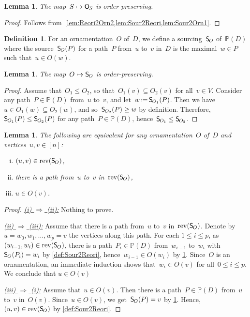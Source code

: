 \documentclass{amsart}
\newtheorem{lemma}[theorem]{Lemma}
\theoremstyle{definition}
\newtheorem{definition}[theorem]{Definition}
\newcommand{\eqdef}{\mbox{\,\raisebox{0.2ex}{\scriptsize\ensuremath{\mathrm:}}\ensuremath{=}\,}} %
\newcommand{\Vincent}[1]{\todo[size=\tiny,color=blue!30]{ #1 \\ \hfill --- V.}\,}
\newcommand{\mymap}[2]{\mathsf{#1}_{\hspace{-.7pt}#2}}
\newcommand{\orn}[1]{\mymap{O}{#1}}  %
\DeclareMathOperator{\rev}{rev} %
\newcommand{\sour}[1]{\mymap{S}{#1}}  %
\newcommand{\PP}{\mathbb P} %
\begin{document}
\begin{lemma}
\label{lem:Sour2Orn3}
The map~$S \mapsto \orn{S}$ is order-preserving.
\end{lemma}

\begin{proof}
Follows from~\cref{lem:Reori2Orn2,lem:Sour2Reori,lem:Sour2Orn1}.
\end{proof}

\begin{definition}
\label{def:Orn2Sour}
For an ornamentation~$O$ of~$D$, we define a sourcing~$\sour{O}$ of~$\PP(D)$ where the source~$\sour{O}(P)$ for a path~$P$ from~$u$ to~$v$ in~$D$ is the maximal~$w \in P$ such that~$u \in O(w)$.
\end{definition}

\begin{lemma}
\label{lem:Orn2Sour1}
The map~$O \mapsto \sour{O}$ is order-preserving.
\end{lemma}

\begin{proof}
Assume that~$O_1 \le O_2$, so that~$O_1(v) \subseteq O_2(v)$ for all~$v \in V$.
Consider any path~$P \in \PP(D)$ from~$u$ to~$v$, and let~$w \eqdef \sour{O_1}(P)$.
Then we have~$u \in O_1(w) \subseteq O_2(w)$, and so~$\sour{O_2}(P) \ge w$ by definition.
Therefore, $\sour{O_1}(P) \le \sour{O_2}(P)$ for any path~$P \in \PP(D)$, hence~${\sour{O_1} \le \sour{O_2}}$.
\end{proof}

\begin{lemma}
\label{lem:Orn2Sour2}
The following are equivalent for any ornamentation~$O$ of~$D$ and vertices~$u,v \in [n]$:
\begin{enumerate}[(i)]
\item $(u,v) \in \rev(\sour{O})$,
\item there is a path from~$u$ to~$v$ in~$\rev(\sour{O})$,
\item $u \in O(v)$.
\end{enumerate}
\end{lemma}

\begin{proof}
\uline{\textsl{(i) $\Rightarrow$ (ii):}}
Nothing to prove.

\medskip\noindent
\uline{\textsl{(ii) $\Rightarrow$ (iii):}}
Assume that there is a path from~$u$ to~$v$ in~$\rev(\sour{O})$.
Denote by~${u = w_0, w_1, \dots, w_p = v}$ the vertices along this path.
For each $1 \le i \le p$, as~$(w_{i-1}, w_i) \in \rev(\sour{O})$, there is a path~$P_i \in \PP(D)$ from~$w_{i-1}$ to~$w_i$ with~$\sour{O}(P_i) = w_i$ by \cref{def:Sour2Reori}, hence~$w_{i-1} \in O(w_i)$ by \cref{def:Orn2Sour}.
Since~$O$ is an ornamentation, an immediate induction shows that~$w_i \in O(v)$ for all~$0 \le i \le p$.
We conclude that $u \in O(v)$

\medskip\noindent
\uline{\textsl{(iii) $\Rightarrow$ (i):}}
Assume that~$u \in O(v)$.
Then there is a path~$P \in \PP(D)$ from~$u$ to~$v$ in~$O(v)$.
Since~${u \in O(v)}$, we get~$\sour{O}(P) = v$ by \cref{def:Orn2Sour}.
Hence,~$(u,v) \in \rev(\sour{O})$ by \cref{def:Sour2Reori}.
\end{proof}
\end{document}
